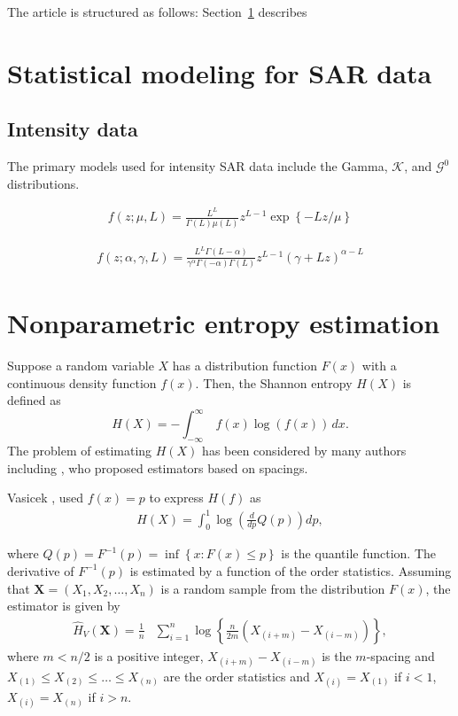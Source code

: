 \documentclass[conference]{IEEEtran}
\begin{document}
The article is structured as follows: 
Section~\ref{sec_02} describes 

\section{Statistical modeling for SAR data}\label{sec_02}

\subsection{Intensity data}

The primary models used for intensity SAR data include the Gamma, $\mathcal{K}$, and $\mathcal{G}^0$ distributions. 


\begin{align}
	f(z; \mu, L)=\frac{L^L}{\Gamma(L)\mu(L)}z^{L-1}\exp\left\{-Lz/\mu\right\}
\end{align}

\begin{align}
	f(z; \alpha, \gamma, L)=\frac{L^L\Gamma(L-\alpha)}{\gamma^{\alpha}\Gamma(-\alpha)\Gamma(L)}z^{L-1}(\gamma+Lz)^{\alpha-L}
\end{align}


\section{Nonparametric entropy estimation}



Suppose a random variable $X$ has a distribution function $F(x)$ with a continuous density function $f(x)$. Then, the Shannon entropy $H(X)$ is defined as
\begin{equation*}
  H(X)=-\int_{-\infty }^\infty \ f(x)\log(f(x))\,dx.
\end{equation*}
The problem of estimating $H(X)$ has been considered by many authors including \cite{vasicek1976test, Bert1992, Wieczorkowski1999, correa1995new}, who proposed estimators based on spacings.

Vasicek \cite{vasicek1976test}, used $f(x)=p$  to express $ H(f)$ as
\begin{align*}
	H(X)= \int_0^1 \log\left(\frac{d}{dp}Q(p)\right)dp,
\end{align*}

where $Q(p)=F^{-1}(p)=\inf\left\{x: F(x)\leq p\right\}$ is the quantile function. The derivative of $F^{-1}(p)$ is  estimated by a function of the order statistics.
Assuming that  $\bm{X}=(X_1, X_2, \ldots,X_n)$ is a random sample from the distribution $F(x)$, the estimator is given by
\begin{align*}
	\widehat{H}_{V}(\bm{X})=\frac{1}{n}&\sum_{i=1}^{n}\log\left\{\frac{n}{2m}\left(X_{(i+m)}-X_{(i-m)}\right)\right\},
	\end{align*}
where $m<n/2$ is a positive integer, $X_{(i+m)}-X_{(i-m)}$ is the $m$-spacing and $X_{(1)}\leq X_{(2)}\leq\ldots\leq X_{(n)}$ are the order statistics and $X_{(i)}= X_{(1)}$ if $i<1$, $X_{(i)}= X_{(n)}$ if $i>n$.
\end{document}
